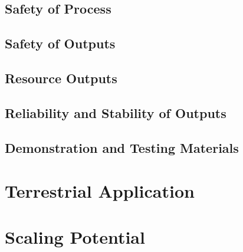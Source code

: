 \documentclass{../tex/report}
\begin{document}

\subsection{Safety of Process}

\subsection{Safety of Outputs}

\subsection{Resource Outputs}

\subsection{Reliability and Stability of Outputs}





\subsection{Demonstration and Testing Materials}

\section{Terrestrial Application}

\section{Scaling Potential}

\newpage



\end{document}
